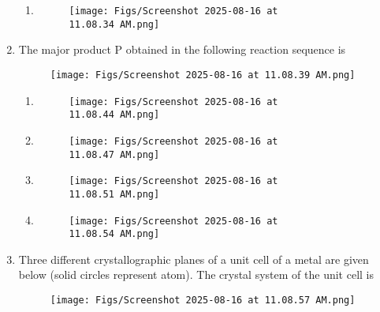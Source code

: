 \documentclass[12pt]{article}
\begin{document}
\begin{enumerate}
\begin{enumerate}
\item  
\begin{figure}[H]
\centering
\texttt{[image: Figs/Screenshot 2025-08-16 at 11.08.34 AM.png]}
\caption{}
\end{figure}

\end{enumerate}






\item The major product P obtained in the following reaction sequence is
\begin{figure}[H]
\centering
\texttt{[image: Figs/Screenshot 2025-08-16 at 11.08.39 AM.png]}
\caption{}
\end{figure}
  

\begin{enumerate} 
    \item \begin{figure}[H]
\centering
\texttt{[image: Figs/Screenshot 2025-08-16 at 11.08.44 AM.png]}
\caption{}
\end{figure}

\item  \begin{figure}[H]
\centering
\texttt{[image: Figs/Screenshot 2025-08-16 at 11.08.47 AM.png]}
\caption{}
\end{figure}


\item  \begin{figure}[H]
\centering
\texttt{[image: Figs/Screenshot 2025-08-16 at 11.08.51 AM.png]}
\caption{}
\end{figure}

\item  
\begin{figure}[H]
\centering
\texttt{[image: Figs/Screenshot 2025-08-16 at 11.08.54 AM.png]}
\caption{}
\end{figure}

\end{enumerate}

\item Three different crystallographic planes of a unit cell of a metal are given below
(solid circles represent atom). The crystal system of the unit cell is

\begin{figure}[H]
\centering
\texttt{[image: Figs/Screenshot 2025-08-16 at 11.08.57 AM.png]}
\caption{}
\end{figure}


\end{enumerate}
\end{document}
